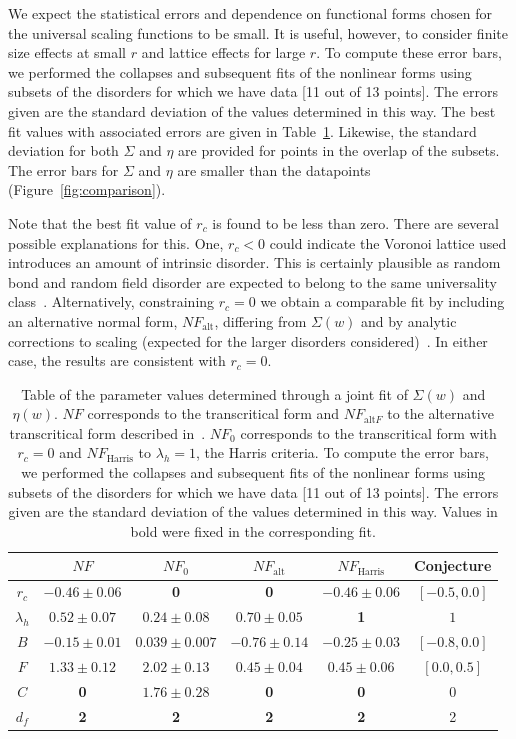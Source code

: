 \documentclass[reprint,amsmath,amssymb,aps,floatfix, prl]{revtex4-1}
\begin{document}
%
We expect the statistical errors and dependence on functional forms chosen for the universal scaling functions to be small. It is useful, however, to consider finite size effects at small $r$ and lattice effects for large $r$.  To compute these error bars,  we performed the collapses and subsequent fits of the nonlinear forms using subsets of the disorders for which we have data [11 out of 13 points]. The errors given are the standard deviation of the values determined in this way. The best fit values with associated errors are given in Table~\ref{tab:params}. Likewise, the standard deviation for both $\Sigma$ and $\eta$ are provided for points in the overlap of the subsets. The error bars for $\Sigma$ and $\eta$ are smaller than the datapoints (Figure~\ref{fig:comparison}). \par
%
Note that the best fit value of $r_c$ is found to be less than zero. There are several possible explanations for this. One, $r_c<0$ could indicate the Voronoi lattice used introduces an amount of intrinsic disorder. This is certainly plausible as random bond and random field disorder are expected to belong to the same universality class~\cite{Dahmen96, Vives95}. Alternatively, constraining $r_c=0$ we obtain a comparable fit by including an alternative normal form, $NF_{\textrm{alt}}$, differing from $\Sigma(w)$ and by analytic corrections to scaling (expected for the larger disorders considered)~\cite{RFIM2Dsupp}. In either case, the results are consistent with $r_c=0.$ \par
%
\begin{table}
	\centering
	\begin{tabular}{|c|c|c|c|c|c|}
	\hline
	& $NF$ & $NF_0$ & $NF_{\textrm{alt}}$ & $NF_{\textrm{Harris}}$ & Conjecture\\
	\hline
	$r_c$ & $-0.46 \pm 0.06$ & \textbf{0} &  \textbf{0} & $-0.46\pm0.06$ & $[-0.5,0.0]$\\
	$\lambda_h$ & $0.52 \pm 0.07$ & $0.24\pm0.08$ & $0.70\pm0.05$ & \textbf{1} & $1$\\
	$B$ & $-0.15 \pm 0.01$ & $0.039\pm0.007$ & $-0.76\pm0.14$ & $-0.25\pm0.03$ & $[-0.8, 0.0]$\\
	$F$ & $1.33 \pm 0.12$ & $2.02\pm0.13$ & $0.45\pm0.04$ & $0.45\pm0.06$ & $[0.0,0.5]$\\
	$C$ & \textbf{0} & $1.76\pm0.28$ &  \textbf{0} & \textbf{0} & 0\\
	$d_f$ & \textbf{2} & \textbf{2} & \textbf{2} & \textbf{2} & 2\\
	\hline
	\end{tabular}
		\caption{Table of the parameter values determined through a joint fit of $\Sigma(w)$ and $\eta(w)$. $NF$ corresponds to the transcritical form and $NF_{\textrm{alt}F}$ to the alternative transcritical form described in~\cite{RFIM2Dsupp}. $NF_0$ corresponds to the transcritical form with $r_c=0$ and $NF_{\textrm{Harris}}$ to $\lambda_h=1$, the Harris criteria. To compute the error bars,  we performed the collapses and subsequent fits of the nonlinear forms using subsets of the disorders for which we have data [11 out of 13 points]. The errors given are the standard deviation of the values determined in this way. Values in bold were fixed in the corresponding fit. }
	\label{tab:params}
\end{table}
\end{document}
